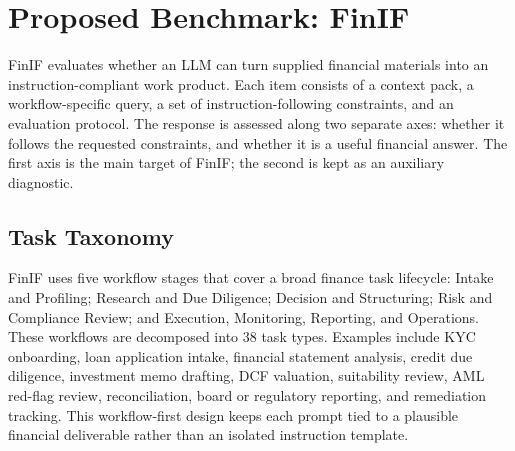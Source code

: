 \section{Proposed Benchmark: FinIF}

FinIF evaluates whether an LLM can turn supplied financial materials into an instruction-compliant work product.
Each item consists of a context pack, a workflow-specific query, a set of instruction-following constraints, and an evaluation protocol.
The response is assessed along two separate axes: whether it follows the requested constraints, and whether it is a useful financial answer.
The first axis is the main target of FinIF; the second is kept as an auxiliary diagnostic.

\begin{table}[t]
\centering
\small
{}
\caption{Comparison with representative instruction-following benchmarks. FinIF focuses on financial workflow deliverables and provides both a hard test set and training data.}
\label{tab:benchmark_compare}
\end{table}

\subsection{Task Taxonomy}

FinIF uses five workflow stages that cover a broad finance task lifecycle: Intake and Profiling; Research and Due Diligence; Decision and Structuring; Risk and Compliance Review; and Execution, Monitoring, Reporting, and Operations.
These workflows are decomposed into 38 task types.
Examples include KYC onboarding, loan application intake, financial statement analysis, credit due diligence, investment memo drafting, DCF valuation, suitability review, AML red-flag review, reconciliation, board or regulatory reporting, and remediation tracking.
This workflow-first design keeps each prompt tied to a plausible financial deliverable rather than an isolated instruction template.

